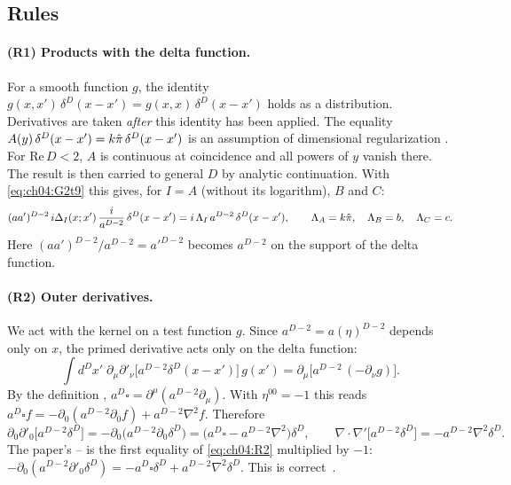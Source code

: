 \subsection{Rules \texorpdfstring{\tD}{}}

\paragraph{(R1) Products with the delta function.}
For a smooth function $g$, the identity $g(x,x')\,\delta^D(x-x')=g(x,x)\,\delta^D(x-x')$ holds as a distribution.
Derivatives are taken \emph{after} this identity has been applied.
The equality $A(y)\,\delta^D(x-x')=k\hat\pi\,\delta^D(x-x')$ is an assumption of dimensional regularization \tA.
For $\mathrm{Re}\,D<2$, $A$ is continuous at coincidence and all powers of $y$ vanish there.
The result is then carried to general $D$ by analytic continuation.
With \eqref{eq:ch04:G2t9} this gives, for $I=A$ (without its logarithm), $B$ and $C$:
\begin{equation}
(aa')^{D-2}\,i\Delta_I(x;x')\,\frac{i}{a^{D-2}}\,\delta^D(x-x')=i\,\Lambda_I\,a^{D-2}\,\delta^D(x-x'),
\qquad \Lambda_A=k\hat\pi,\quad \Lambda_B=b,\quad \Lambda_C=c .
\label{eq:ch04:R1}
\end{equation}
Here $(aa')^{D-2}/a^{D-2}=a'^{D-2}$ becomes $a^{D-2}$ on the support of the delta function.

\paragraph{(R2) Outer derivatives.}
We act with the kernel on a test function $g$.
Since $a^{D-2}=a(\eta)^{D-2}$ depends only on $x$, the primed derivative acts only on the delta function:
\begin{equation}
\int d^Dx'\;\partial_\mu\partial'_\nu\big[a^{D-2}\delta^D(x-x')\big]\,g(x')=\partial_\mu\big[a^{D-2}\,(-\partial_\nu g)\big].
\end{equation}
By the definition , $a^D\square=\partial^\mu(a^{D-2}\partial_\mu)$. With $\eta^{00}=-1$ this reads
$a^D\square f=-\partial_0(a^{D-2}\partial_0f)+a^{D-2}\nabla^2f$. Therefore
\begin{equation}
\partial_0\partial'_0\big[a^{D-2}\delta^D\big]=-\partial_0\big(a^{D-2}\partial_0\delta^D\big)=\big(a^D\square-a^{D-2}\nabla^2\big)\delta^D,
\qquad
\nabla\!\cdot\!\nabla'\big[a^{D-2}\delta^D\big]=-a^{D-2}\nabla^2\delta^D .
\label{eq:ch04:R2}
\end{equation}
The paper's -- is the first equality of \eqref{eq:ch04:R2} multiplied by $-1$:
$-\partial_0(a^{D-2}\partial'_0\delta^D)=-a^D\square\delta^D+a^{D-2}\nabla^2\delta^D$.
This is correct~\chIVok.

